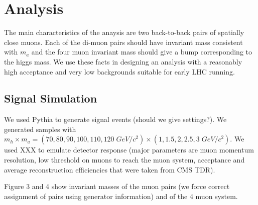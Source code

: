 \documentclass[aps,prd,onecolumn,superscriptaddress,showpacs]{revtex4}
\begin{document}
\section{Analysis}

The main characteristics of the anaysis are two back-to-back pairs of spatially 
close muons. Each of the di-muon pairs should have invariant mass consistent 
with $m_a$ and the four muon invariant mass should give a bump corresponding to
the higgs mass. We use these facts in designing an analysis with a reasonably
high acceptance and very low backgrounds suitable for early LHC running.

\subsection{Signal Simulation}
We used Pythia to generate signal events (should we give settings?). We
generated samples with $m_h \times m_a = (70, 80, 90, 100, 110, 120 \; GeV/c^2) \times
(1, 1.5, 2, 2.5, 3 \; GeV/c^2)$. We used XXX to emulate detector response (major
parameters are muon momentum resolution, low threshold on muons to reach 
the muon system, acceptance and average reconstruction efficiencies that were
taken from CMS TDR). 

Figure 3 and 4 show invariant masses of the muon pairs (we force correct assignment of pairs using generator
information) and of the 4 muon system.
\end{document}
